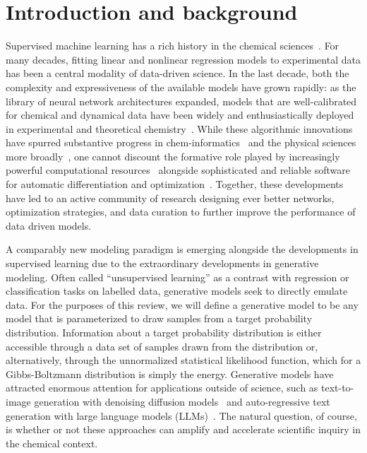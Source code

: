 \documentclass[11pt]{article}
\begin{document}
\section{Introduction and background}
\label{sec:intro}


Supervised machine learning has a rich history in the chemical sciences~\cite{lederberg_applications_1969}. 
For many decades, fitting linear and nonlinear regression models to experimental data has been a central modality of data-driven science.
In the last decade, both the complexity and expressiveness of the available models have grown rapidly: as the library of neural network architectures expanded, models that are well-calibrated for chemical and dynamical data have been widely and enthusiastically deployed in experimental and theoretical chemistry~\cite{mater_deep_2019}. 
While these algorithmic innovations have spurred substantive progress in chem-informatics~\cite{mater_deep_2019} and the physical sciences more broadly~\cite{carleo_machine_2019}, one cannot discount the formative role played by increasingly powerful computational resources~\cite{amodei_ai_2018} alongside sophisticated and reliable software for automatic differentiation and optimization~\cite{paszke_pytorch_2019, bradbury_jax_2018, broughton_tensorflow_2020}. 
Together, these developments have led to an active community of research designing ever better networks, optimization strategies, and data curation to further improve the performance of data driven models.

A comparably new modeling paradigm is emerging alongside the developments in supervised learning due to the extraordinary developments in generative modeling.
Often called ``unsupervised learning'' as a contrast with regression or classification tasks on labelled data, generative models seek to directly emulate data.
For the purposes of this review, we will define a generative model to be any model that is parameterized to draw samples from a target probability distribution.
Information about a target probability distribution is either accessible through a data set of samples drawn from the distribution or, alternatively, through the unnormalized statistical likelihood function, which for a Gibbs-Boltzmann distribution is simply the energy.  
Generative models have attracted enormous attention for applications outside of science, such as text-to-image generation with denoising diffusion models~\cite{song_score-based_2022,ho_denoising_nodate} and auto-regressive text generation with large language models (LLMs)~\cite{vaswani_attention_2017}. 
The natural question, of course, is whether or not these approaches can amplify and accelerate scientific inquiry in the chemical context.
\end{document}
